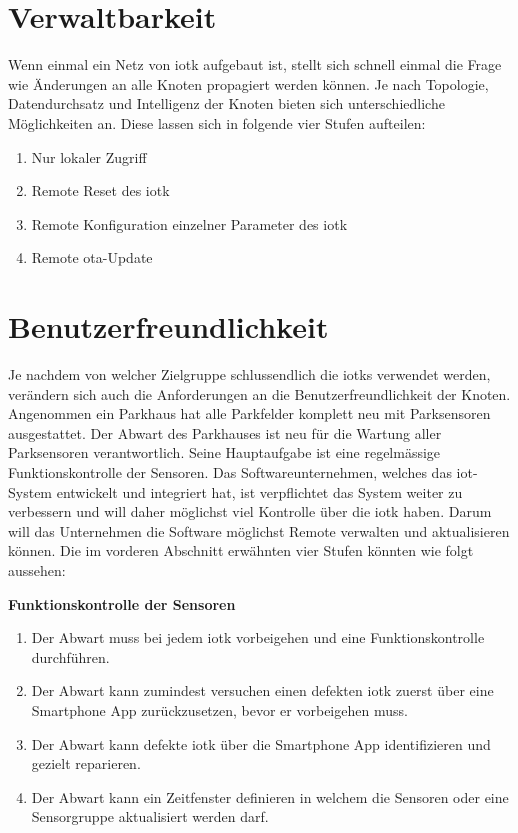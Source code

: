 \section{Verwaltbarkeit}

Wenn einmal ein Netz von \gls{iotk} aufgebaut ist, stellt sich schnell einmal die Frage wie Änderungen an alle Knoten propagiert werden können. Je nach Topologie, Datendurchsatz und Intelligenz der Knoten bieten sich unterschiedliche Möglichkeiten an. Diese lassen sich in folgende vier Stufen aufteilen:

\begin{enumerate}
  \item Nur lokaler Zugriff
  \item Remote Reset des \gls{iotk}
  \item Remote Konfiguration einzelner Parameter des \gls{iotk}
  \item Remote \acrfull{ota}-Update 
\end{enumerate}

\section{Benutzerfreundlichkeit}

Je nachdem von welcher Zielgruppe schlussendlich die \glspl{iotk} verwendet werden, verändern sich auch die Anforderungen an die Benutzerfreundlichkeit der Knoten. Angenommen ein Parkhaus hat alle Parkfelder komplett neu mit Parksensoren ausgestattet. Der Abwart des Parkhauses ist neu für die Wartung aller Parksensoren verantwortlich. Seine Hauptaufgabe ist eine regelmässige Funktionskontrolle der Sensoren. Das Softwareunternehmen, welches das \acrshort{iot}-System entwickelt und integriert hat, ist verpflichtet das System weiter zu verbessern und will daher möglichst viel Kontrolle über die \gls{iotk} haben. Darum will das Unternehmen die Software möglichst Remote verwalten und aktualisieren können.
Die im vorderen Abschnitt erwähnten vier Stufen könnten wie folgt aussehen:

\textbf{Funktionskontrolle der Sensoren}
\begin{enumerate}  
  \item Der Abwart muss bei jedem \gls{iotk} vorbeigehen und eine Funktionskontrolle durchführen.
  \item Der Abwart kann zumindest versuchen einen defekten \gls{iotk} zuerst über eine Smartphone App zurückzusetzen, bevor er vorbeigehen muss.
  \item Der Abwart kann defekte \gls{iotk} über die Smartphone App identifizieren und gezielt reparieren.
  \item Der Abwart kann ein Zeitfenster definieren in welchem die Sensoren oder eine Sensorgruppe aktualisiert werden darf.
\end{enumerate}

